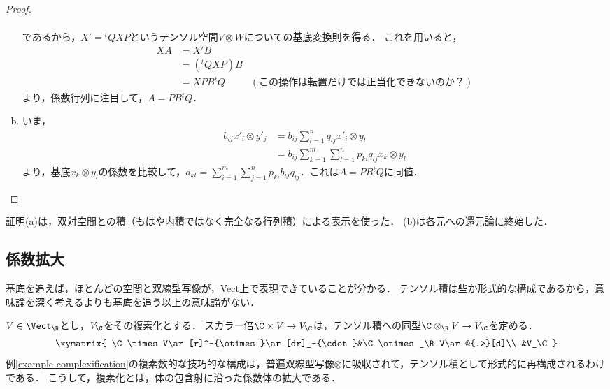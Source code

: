 \documentclass[uplatex, dvipdfmx]{jsreport}
\begin{document}
\begin{proof}
\begin{enumerate}[(a)]
\begin{align*}
        \end{align*}
        であるから，$X'={}^t\!QXP$というテンソル空間$V\otimes W$についての基底変換則を得る．
        これを用いると，
        \begin{align*}
            XA&=X'B\\
            &=({}^t\!QXP)B\\
            &=XPB{}^t\!Q&(この操作は転置だけでは正当化できないのか？)
        \end{align*}
        より，係数行列に注目して，$A=PB{}^t\!Q$．
        \item いま，\begin{align*}
            b_{ij}x'_i\otimes y'_j&=b_{ij}\sum^n_{l=1} q_{lj}x'_i\otimes y_l\\
            &=b_{ij}\sum^m_{k=1}\sum^n_{l=1}p_{ki}q_{lj}x_k\otimes y_l
        \end{align*}
        より，基底$x_k\otimes y_l$の係数を比較して，$a_{kl}=\sum^m_{i=1}\sum^n_{j=1}p_{ki}b_{ij}q_{lj}$．これは$A=PB{}^t\!Q$に同値．
    \end{enumerate}
\end{proof}
\begin{remarks}
    証明(a)は，双対空間との積（もはや内積ではなく完全なる行列積）による表示を使った．
    (b)は各元への還元論に終始した．
\end{remarks}

\subsection{係数拡大}

\begin{tcolorbox}[colframe=ForestGreen, colback=ForestGreen!10!white, breakable ,colbacktitle=ForestGreen!40!white, coltitle=black,fonttitle=\bfseries\sffamily,
    title=空間]
    基底を追えば，ほとんどの空間と双線型写像が，Vect上で表現できていることが分かる．
    テンソル積は些か形式的な構成であるから，意味論を深く考えるよりも基底を追う以上の意味論がない．
\end{tcolorbox}

\begin{example}
    $V\in\Vect_\R$とし，$V_\C$をその複素化とする．
    スカラー倍$\C\times V\to V_\C$は，テンソル積への同型$\C\otimes_\R V\to V_\C$を定める．
    \[\xymatrix{
        \C\times V\ar[r]^-{\otimes}\ar[dr]_-{\cdot}&\C\otimes_\R V\ar@{.>}[d]\\
        &V_\C
    }\]
    例\ref{example-complexification}の複素数的な技巧的な構成は，普遍双線型写像$\otimes$に吸収されて，テンソル積として形式的に再構成されるわけである．
    こうして，複素化とは，体の包含射に沿った係数体の拡大である．
\end{example}
\end{document}
